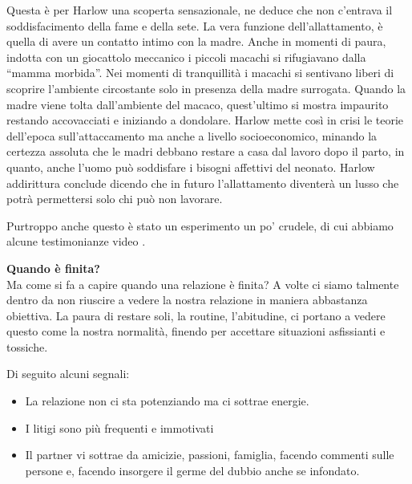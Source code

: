 \documentclass[12pt]{book} %
\begin{document}
\begin{mdframed}[linewidth=1pt]
Questa è per Harlow una scoperta sensazionale, ne deduce che non c'entrava il soddisfacimento della fame e della sete. La vera funzione dell'allattamento, è quella di avere un contatto intimo
con la madre. Anche in momenti di paura, indotta con un giocattolo meccanico i piccoli macachi si rifugiavano dalla “mamma morbida”. Nei momenti di tranquillità i macachi si sentivano liberi di scoprire
l'ambiente circostante solo in presenza della madre surrogata. Quando la madre viene tolta
dall'ambiente del macaco, quest'ultimo si mostra impaurito restando
accovacciati e iniziando a dondolare. Harlow mette così in crisi le teorie dell'epoca
sull'attaccamento ma anche a livello socioeconomico, minando la certezza assoluta che le madri
debbano restare a casa dal lavoro dopo il parto, in quanto, anche l'uomo può soddisfare i bisogni affettivi del neonato. Harlow addirittura conclude dicendo che in futuro l'allattamento
diventerà un lusso che potrà permettersi solo chi può non lavorare.

Purtroppo anche questo è stato un esperimento un po' crudele, di cui abbiamo alcune testimonianze
video
.
\end{mdframed} 

\noindent \textbf{\large Quando è finita?} \\
Ma come si fa a capire quando una relazione è finita? A volte ci siamo talmente dentro da non riuscire a vedere la nostra relazione in maniera abbastanza 
obiettiva. La paura di restare soli, la routine,
l'abitudine, ci portano a vedere questo come la nostra normalità, finendo per accettare situazioni asfissianti e tossiche. 

Di seguito alcuni segnali:

\begin{itemize}
\item La relazione non ci sta potenziando ma ci sottrae energie.
\item I litigi sono più frequenti e immotivati 
\item Il partner vi sottrae da amicizie, passioni, famiglia, facendo commenti sulle persone e, facendo insorgere il germe del dubbio anche se infondato.
\end{itemize}
\end{document}
